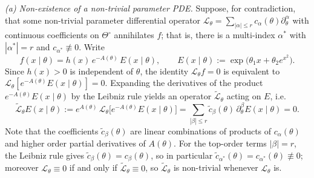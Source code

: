 \documentclass[11pt,twoside]{article} %
\begin{document}
\medskip
\emph{(a) Non-existence of a non-trivial parameter PDE.}
Suppose, for contradiction, that some non-trivial parameter differential operator
$\mathcal L_\theta=\sum_{|\alpha|\le r}c_\alpha(\theta)\partial^\alpha_\theta$ with continuous coefficients on
$\Theta^\circ$ annihilates $f$; that is, there is a multi-index $\alpha^*$ with $|\alpha^*|=r$ and
$c_{\alpha^*}\not\equiv0$. Write
\begin{equation*}
    f(x\mid\theta)=h(x)\,e^{-A(\theta)}\,E(x\mid\theta),\qquad E(x\mid\theta):=\exp\big(\theta_1x+\theta_2e^{x^2}\big).
\end{equation*}
Since $h(x)>0$ is independent of $\theta$, the identity $\mathcal L_\theta f=0$ is equivalent to
$\mathcal L_\theta[e^{-A(\theta)}E(x\mid\theta)]=0$. Expanding the derivatives of the product
$e^{-A(\theta)}E(x\mid\theta)$ by the Leibniz rule yields an operator $\tilde{\mathcal L}_\theta$ acting on
$E$, i.e.
\begin{equation}
    \tilde{\mathcal L}_\theta E(x\mid\theta)
    :=e^{A(\theta)}\,\mathcal L_\theta\big[e^{-A(\theta)}E(x\mid\theta)\big]
    =\sum_{|\beta|\le r}\tilde c_\beta(\theta)\,\partial^\beta_\theta E(x\mid\theta)=0.
    \label{eq:app_super_a1}
\end{equation}
Note that the coefficients $\tilde c_\beta(\theta)$ are linear combinations of products of $c_\alpha(\theta)$ and higher order partial
derivatives of $A(\theta)$. For the top-order terms $|\beta|=r$, the Leibniz rule gives
$\tilde c_\beta(\theta)=c_\beta(\theta)$, so in particular $\tilde c_{\alpha^*}(\theta)=c_{\alpha^*}(\theta)
\not\equiv0$; moreover $\mathcal L_\theta\equiv0$ if and only if $\tilde{\mathcal L}_\theta\equiv0$, so
$\tilde{\mathcal L}_\theta$ is non-trivial whenever $\mathcal L_\theta$ is.
\end{document}
